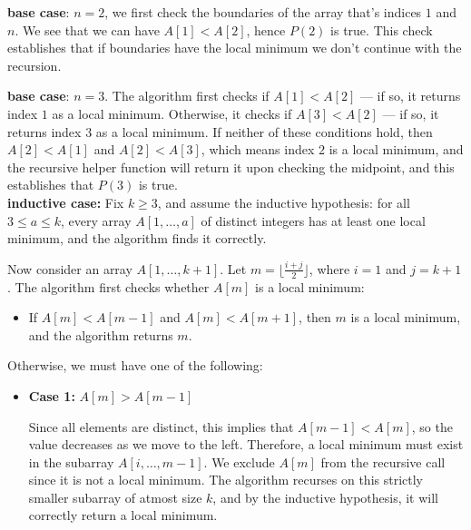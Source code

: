 \begin{parts}
\begin{customsolutionbox}
            \textbf{base case}: $n=2$, we first check the boundaries of the array that's indices $1$ and $n$. We see that we can 
            have $A[1] < A[2]$, hence $P(2)$ is true. This check establishes that if boundaries have the local minimum we don't continue with the 
            recursion. 
            
            \textbf{base case}: $n=3$.
            The algorithm first checks if $A[1] < A[2]$ — if so, it returns index $1$ as a local minimum.  
            Otherwise, it checks if $A[3] < A[2]$ — if so, it returns index $3$ as a local minimum.  
            If neither of these conditions hold, then $A[2] < A[1]$ and $A[2] < A[3]$, which means index $2$ is a local minimum, 
            and the recursive helper function will return it upon checking the midpoint, and this establishes that $P(3)$ is true. \\

            \textbf{inductive case:} Fix $k \geq 3$, and assume the inductive hypothesis: for all $3 \leq a \leq k$, every array $A[1, \ldots, a]$ 
            of distinct integers has at least one local minimum, and the algorithm finds it correctly.

            Now consider an array $A[1, \ldots, k+1]$. Let $m = \lfloor \frac{i + j}{2} \rfloor$, where $i = 1$ and $j = k+1$. 
            The algorithm first checks whether $A[m]$ is a local minimum:
            \begin{itemize}
                \item If $A[m] < A[m-1]$ and $A[m] < A[m+1]$, then $m$ is a local minimum, and the algorithm returns $m$.
            \end{itemize}

            Otherwise, we must have one of the following:
            \begin{itemize}
                \item \textbf{Case 1:} $A[m] > A[m - 1]$
            
                Since all elements are distinct, this implies that $A[m - 1] < A[m]$, so the value decreases as we move to the left.
                Therefore, a local minimum must exist in the subarray $A[i, \ldots, m - 1]$.
                We exclude $A[m]$ from the recursive call since it is not a local minimum. 
                The algorithm recurses on this strictly smaller subarray of atmost size $k$, and by the inductive hypothesis, 
                it will correctly return a local minimum.
            

\end{itemize}
\end{customsolutionbox}
\end{parts}
